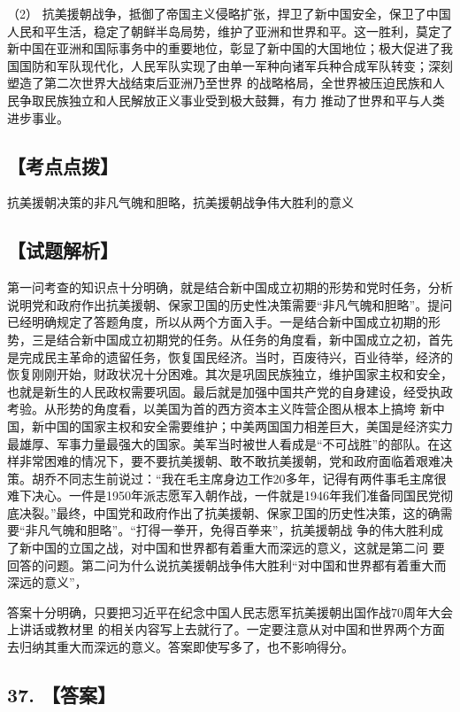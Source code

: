 \documentclass[UTF8,11pt]{ctexart}
\begin{document}
（2） 抗美援朝战争，抵御了帝国主义侵略扩张，捍卫了新中国安全，保卫了中国人民和平生活，稳定了朝鲜半岛局势，维护了亚洲和世界和平。这一胜利，莫定了新中国在亚洲和国际事务中的重要地位，彰显了新中国的大国地位；极大促进了我国国防和军队现代化，人民军队实现了由单一军种向诸军兵种合成军队转变；深刻塑造了第二次世界大战结束后亚洲乃至世界 的战略格局，全世界被压迫民族和人民争取民族独立和人民解放正义事业受到极大鼓舞，有力 推动了世界和平与人类进步事业。


\subsection*{【考点点拨】}

抗美援朝决策的非凡气魄和胆略，抗美援朝战争伟大胜利的意义


\subsection*{【试题解析】}

第一问考查的知识点十分明确，就是结合新中国成立初期的形势和党时任务，分析 说明党和政府作出抗美援朝、保家卫国的历史性决策需要“非凡气魄和胆略”。提问已经明确规定了答题角度，所以从两个方面入手。一是结合新中国成立初期的形势，三是结合新中国成立初期党的任务。从任务的角度看，新中国成立之初，首先是完成民主革命的遗留任务，恢复国民经济。当时，百废待兴，百业待举，经济的恢复刚刚开始，财政状况十分困难。其次是巩固民族独立，维护国家主权和安全，也就是新生的人民政权需要巩固。最后就是加强中国共产党的自身建设，经受执政考验。从形势的角度看，以美国为首的西方资本主义阵营企图从根本上搞垮 新中国，新中国的国家主权和安全需要维护；中美两国国力相差巨大，美国是经济实力最雄厚、军事力量最强大的国家。美军当时被世人看成是“不可战胜”的部队。在这样非常困难的情况下，要不要抗美援朝、敢不敢抗美援朝，党和政府面临着艰难决策。胡乔不同志生前说过：“我在毛主席身边工作20多年，记得有两件事毛主席很难下决心。一件是1950年派志愿军入朝作战，一件就是1946年我们准备同国民党彻底决裂。”最终，中国党和政府作出了抗美援朝、保家卫国的历史性决策，这的确需要“非凡气魄和胆略”。“打得一拳开，免得百拳来”，抗美援朝战 争的伟大胜利成了新中国的立国之战，对中国和世界都有着重大而深远的意义，这就是第二问 要回答的问题。第二问为什么说抗美援朝战争伟大胜利“对中国和世界都有着重大而深远的意义”，


答案十分明确，只要把习近平在纪念中国人民志愿军抗美援朝出国作战70周年大会上讲话或教材里 的相关内容写上去就行了。一定要注意从对中国和世界两个方面去归纳其重大而深远的意义。答案即使写多了，也不影响得分。


\subsection*{37. 【答案】}
\end{document}
